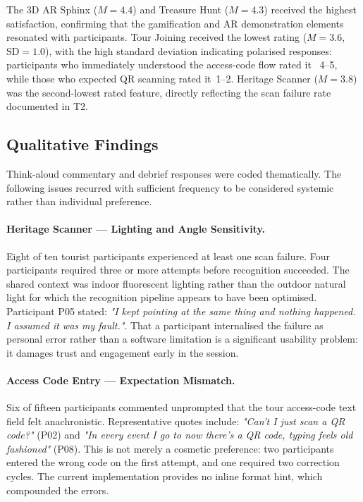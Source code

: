 The 3D AR Sphinx ($M = 4.4$) and Treasure Hunt ($M = 4.3$) received the highest
satisfaction, confirming that the gamification and AR demonstration elements resonated
with participants. Tour Joining received the lowest rating ($M = 3.6$, $\text{SD} =
1.0$), with the high standard deviation indicating polarised responses: participants
who immediately understood the access-code flow rated it ~4--5, while those who
expected QR scanning rated it~1--2. Heritage Scanner ($M = 3.8$) was the second-lowest
rated feature, directly reflecting the scan failure rate documented in T2.

\subsection{Qualitative Findings}
\label{sec:qualitative}

Think-aloud commentary and debrief responses were coded thematically. The following
issues recurred with sufficient frequency to be considered systemic rather than
individual preference.

\paragraph{Heritage Scanner — Lighting and Angle Sensitivity.}
Eight of ten tourist participants experienced at least one scan failure. Four
participants required three or more attempts before recognition succeeded. The shared
context was indoor fluorescent lighting rather than the outdoor natural light for which
the recognition pipeline appears to have been optimised. Participant P05 stated:
\textit{"I kept pointing at the same thing and nothing happened. I assumed it was my
fault."}. That a participant internalised the failure as personal error rather than a
software limitation is a significant usability problem: it damages trust and engagement
early in the session.

\paragraph{Access Code Entry — Expectation Mismatch.}
Six of fifteen participants commented unprompted that the tour access-code text field
felt anachronistic. Representative quotes include: \textit{"Can't I just scan a QR
code?"} (P02) and \textit{"In every event I go to now there's a QR code, typing feels
old fashioned"} (P08). This is not merely a cosmetic preference: two participants
entered the wrong code on the first attempt, and one required two correction cycles.
The current implementation provides no inline format hint, which compounded the errors.

